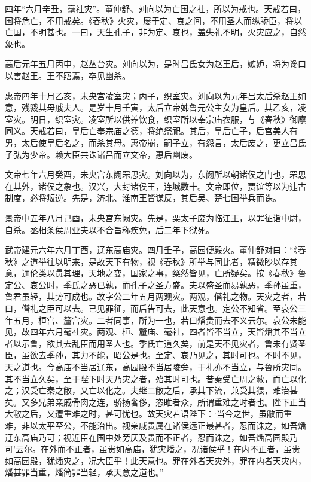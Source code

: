 \documentclass[12pt,UTF8]{ctexbook}
\begin{document}
四年“六月辛丑，毫社灾”。董仲舒、刘向以为亡国之社，所以为戒也。天戒若曰，国将危亡，不用戒矣。《春秋》火灾，屡于定、哀之间，不用圣人而纵骄臣，将以亡国，不明甚也。一曰，天生孔子，非为定、哀也，盖失礼不明，火灾应之，自然象也。



高后元年五月丙申，赵丛台灾。刘向以为，是时吕氏女为赵王后，嫉妒，将为谗口以害赵王。王不寤焉，卒见幽杀。



惠帝四年十月乙亥，未央宫凌室灾；丙子，织室灾。刘向以为元年吕太后杀赵王如意，残戮其母戚夫人。是岁十月壬寅，太后立帝姊鲁元公主女为皇后。其乙亥，凌室灾。明日，织室灾。凌室所以供养饮食，织室所以奉宗庙衣服，与《春秋》御廪同义。天戒若曰，皇后亡奉宗庙之德，将绝祭祀。其后，皇后亡子，后宫美人有男，太后使皇后名之，而杀其母。惠帝崩，嗣子立，有怨言，太后废之，更立吕氏子弘为少帝。赖大臣共诛诸吕而立文帝，惠后幽废。



文帝七年六月癸酉，未央宫东阙罘思灾。刘向以为，东阙所以朝诸侯之门也，罘思在其外，诸侯之象也。汉兴，大封诸侯王，连城数十。文帝即位，贾谊等以为违古制度，必将叛逆。先是，济北、淮南王皆谋反，其后吴、楚七国举兵而诛。



景帝中五年八月己酉，未央宫东阙灾。先是，栗太子废为临江王，以罪征诣中尉，自杀。丞相条侯周亚夫以不合旨称疾免，后二年下狱死。



武帝建元六年六月丁酉，辽东高庙灾。四月壬子，高园便殿火。董仲舒对曰：“《春秋》之道举往以明来，是故天下有物，视《春秋》所举与同比者，精微眇以存其意，通伦类以贯其理，天地之变，国家之事，粲然皆见，亡所疑矣。按《春秋》鲁定公、哀公时，季氏之恶已孰，而孔子之圣方盛。夫以盛圣而易孰恶，季孙虽重，鲁君虽轻，其势可成也。故字公二年五月两观灾。两观，僭礼之物。天灾之者，若曰，僭礼之臣可以去。已见罪征，而后告可去，此天意也。定公不知省。至哀公三年五月，桓宫、釐宫灾。二者同事，所为一也，若曰燔贵而去不义云尔。哀公未能见，故四年六月毫社灾。两观、桓、釐庙、毫社，四者皆不当立，天皆燔其不当立者以示鲁，欲其去乱臣而用圣人也。季氏亡道久矣，前是天不见灾者，鲁未有贤圣臣，虽欲去季孙，其力不能，昭公是也。至定、哀乃见之，其时可也。不时不见，天之道也。今高庙不当居辽东，高园殿不当居陵旁，于礼亦不当立，与鲁所灾同。其不当立久矣，至于陛下时天乃灾之者，殆其时可也。昔秦受亡周之敝，而亡以化之；汉受亡秦之敝，又亡以化之。夫继二敝之后，承其下流，兼受其猥，难治甚矣。又多兄弟亲戚骨肉之连，骄扬奢侈，恣睢者众，所谓重难之时者也。陛下正当大敝之后，又遭重难之时，甚可忧也。故天灾若语陛下：‘当今之世，虽敝而重难，非以太平至公，不能治出。视亲戚贵属在诸侯远正最甚者，忍而诛之，如吾燔辽东高庙乃可；视近臣在国中处旁仄及贵而不正者，忍而诛之，如吾燔高园殿乃可’云尔。在外而不正者，虽贵如高庙，犹灾燔之，况诸侯乎！在内不正者，虽贵如高园殿，犹燔灾之，况大臣乎！此天意也。罪在外者天灾外，罪在内者天灾内，燔甚罪当重，燔简罪当轻，承天意之道也。”
\end{document}
